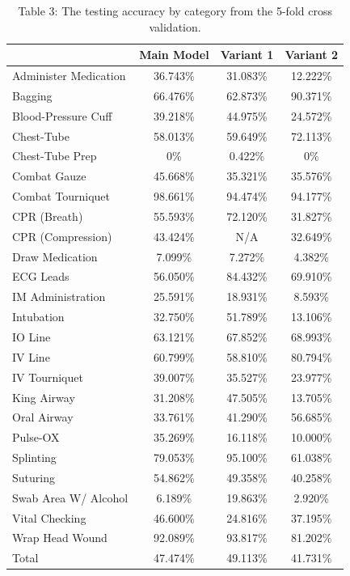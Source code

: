 \documentclass[letterpaper, 10 pt, conference]{ieeeconf}  %
\begin{document}
\begin{table}[!htb]
\begin{center}
 \begin{tabular}{||l c c c  ||} 
 \hline
 & Main Model & Variant 1 & Variant 2  \\ [0.5ex] 
 \hline\hline
Administer Medication & 36.743\% & 31.083\% & 12.222\%  \\ 
 \hline
Bagging & 66.476\% & 62.873\% & 90.371\% \\ 
 \hline
Blood-Pressure Cuff & 39.218\% & 44.975\% & 24.572\% \\ 
 \hline
Chest-Tube & 58.013\% & 59.649\% & 72.113\% \\ 
 \hline
Chest-Tube Prep & 0\% & 0.422\% & 0\% \\ 
 \hline
Combat Gauze & 45.668\% & 35.321\% & 35.576\% \\ 
 \hline
 Combat Tourniquet & 98.661\% & 94.474\% & 94.177\% \\ 
 \hline
CPR (Breath) & 55.593\% & 72.120\% & 31.827\% \\ 
 \hline
CPR (Compression) & 43.424\% & N/A & 32.649\% \\ 
 \hline
 Draw Medication & 7.099\% & 7.272\% & 4.382\% \\ 
 \hline
 ECG Leads & 56.050\% & 84.432\% & 69.910\% \\ 
 \hline
 IM Administration & 25.591\% & 18.931\% & 8.593\% \\ 
 \hline
 Intubation & 32.750\% & 51.789\% & 13.106\% \\ 
 \hline
 IO Line & 63.121\% & 67.852\% & 68.993\% \\ 
 \hline
 IV Line & 60.799\% & 58.810\% & 80.794\% \\ 
 \hline
 IV Tourniquet & 39.007\% & 35.527\% & 23.977\% \\ 
 \hline
 King Airway & 31.208\% & 47.505\% & 13.705\% \\ 
 \hline
 Oral Airway & 33.761\% & 41.290\% & 56.685\% \\ 
 \hline
 Pulse-OX & 35.269\% & 16.118\% & 10.000\%\\ 
 \hline
 Splinting & 79.053\% & 95.100\% & 61.038\% \\ 
 \hline
 Suturing & 54.862\% & 49.358\% & 40.258\% \\ 
 \hline
 Swab Area W/ Alcohol & 6.189\% & 19.863\% & 2.920\% \\ 
 \hline
 Vital Checking & 46.600\% & 24.816\% & 37.195\% \\ 
 \hline
 Wrap Head Wound & 92.089\% &93.817\% & 81.202\% \\ 
 \hline
 Total & 47.474\% & 49.113\% & 41.731\% \\ 
 \hline
\end{tabular}
\caption{Table 3: The  testing accuracy by category from the 5-fold cross validation. }
\end{center}
\end{table}
\end{document}
